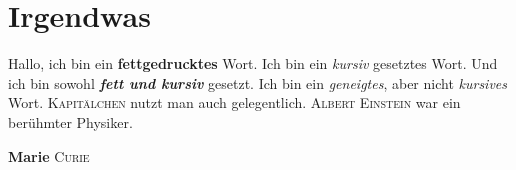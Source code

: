 \documentclass[12pt,ngerman,parskip=half]{scrreprt}
\newcommand{\physiker}[1]{\textsc{#1}}
\newcommand{\Physiker}[2]{\textcolor{fuh}{\textbf{#1} \textsc{#2}}}
\begin{document}
\blindtext[1] 

\chapter{Irgendwas}

Hallo, ich bin ein \textbf{fettgedrucktes} Wort. Ich bin ein \textit{kursiv} gesetztes Wort. Und ich bin sowohl \textbf{\textit{fett und kursiv}} gesetzt. Ich bin ein \textsl{geneigtes}, aber nicht \textit{kursives} Wort. \textsc{Kapitälchen} nutzt man auch gelegentlich. \physiker{Albert Einstein} war ein berühmter Physiker.

\Physiker{Marie}{Curie}
\end{document}
